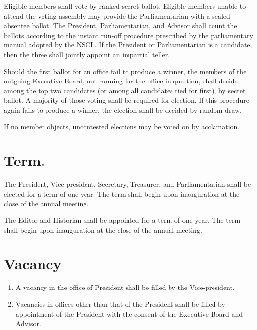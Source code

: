 \documentclass{bylaws}
\newcommand{\NSCL}{\textsc{NSCL}\xspace}
\begin{document}
\begin{linenumbers}[1]
\begin{enumerate}
    \sub[Voting] Eligible members shall vote by ranked secret
    ballot. Eligible members unable to attend the voting assembly may
    provide the Parliamentarian with a sealed absentee ballot. The
    President, Parliamentarian, and Advisor shall count the ballots
    according to the instant run-off procedure prescribed by the
    parliamentary manual adopted by the \NSCL. If the President or
    Parliamentarian is a candidate, then the three shall jointly appoint
    an impartial teller.
    
    \sub[No Election] Should the first ballot for an office fail to
    produce a winner, the members of the outgoing Executive Board, not
    running for the office in question, shall decide among the top two
    candidates (or among all candidates tied for first), by secret
    ballot. A majority of those voting shall be required for
    election. If this procedure again fails to produce a winner, the
    election shall be decided by random draw.
    
     If no member objects, uncontested
    elections may be voted on by acclamation.\\
  \end{enumerate}

  \section{Term.}
  \begin{enumerate}
     The President, Vice-president, Secretary,
    Treasurer, and Parliamentarian shall be elected for a term of one
    year. The term shall begin upon inauguration at the close of the
    annual meeting.
    
     The Editor and Historian shall be
    appointed for a term of one year. The term shall begin upon
    inauguration at the close of the annual meeting.\\
  \end{enumerate}

  \section{Vacancy}
  \begin{enumerate}
  \item A vacancy in the office of President shall be filled by the
    Vice-president.
  \item Vacancies in offices other than that of the President shall be
    filled by appointment of the President with the consent of the
    Executive Board and Advisor.\\
  \end{enumerate}


\end{linenumbers}
\end{document}
